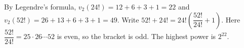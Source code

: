 By Legendre's formula, $v_2(24!)=12+6+3+1=22$ and $v_2(52!)=26+13+6+3+1=49$. Write $52!+24!=24!\left(\dfrac{52!}{24!}+1\right)$. Here $\dfrac{52!}{24!}=25\cdot26\cdots52$ is even, so the bracket is odd. The highest power is $\boxed{2^{22}}$.

